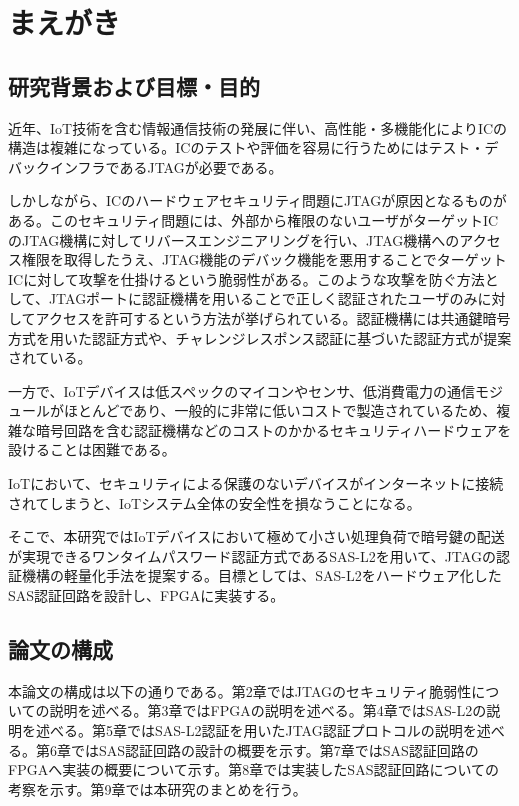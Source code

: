 \documentclass{thesis}
\begin{document}
\tableofcontents

\chapter{まえがき}
\section{研究背景および目標・目的}
近年、IoT技術を含む情報通信技術の発展に伴い、高性能・多機能化によりICの構造は複雑になっている。ICのテストや評価を容易に行うためにはテスト・デバックインフラであるJTAGが必要である。\par
しかしながら、ICのハードウェアセキュリティ問題にJTAGが原因となるものがある。このセキュリティ問題には、外部から権限のないユーザがターゲットICのJTAG機構に対してリバースエンジニアリングを行い、JTAG機構へのアクセス権限を取得したうえ、JTAG機能のデバック機能を悪用することでターゲットICに対して攻撃を仕掛けるという脆弱性がある。このような攻撃を防ぐ方法として、JTAGポートに認証機構を用いることで正しく認証されたユーザのみに対してアクセスを許可するという方法が挙げられている。認証機構には共通鍵暗号方式を用いた認証方式や、チャレンジレスポンス認証に基づいた認証方式が提案されている。\cite{JTAGセキュリティ}\par
一方で、IoTデバイスは低スペックのマイコンやセンサ、低消費電力の通信モジュールがほとんどであり、一般的に非常に低いコストで製造されているため、複雑な暗号回路を含む認証機構などのコストのかかるセキュリティハードウェアを設けることは困難である。\par
IoTにおいて、セキュリティによる保護のないデバイスがインターネットに接続されてしまうと、IoTシステム全体の安全性を損なうことになる。\par
そこで、本研究ではIoTデバイスにおいて極めて小さい処理負荷で暗号鍵の配送が実現できるワンタイムパスワード認証方式であるSAS-L2を用いて、JTAGの認証機構の軽量化手法を提案する。目標としては、SAS-L2をハードウェア化したSAS認証回路を設計し、FPGAに実装する。
\section{論文の構成}
本論文の構成は以下の通りである。第2章ではJTAGのセキュリティ脆弱性についての説明を述べる。第3章ではFPGAの説明を述べる。第4章ではSAS-L2の説明を述べる。第5章ではSAS-L2認証を用いたJTAG認証プロトコルの説明を述べる。第6章ではSAS認証回路の設計の概要を示す。第7章ではSAS認証回路のFPGAへ実装の概要について示す。第8章では実装したSAS認証回路についての考察を示す。第9章では本研究のまとめを行う。
\end{document}
